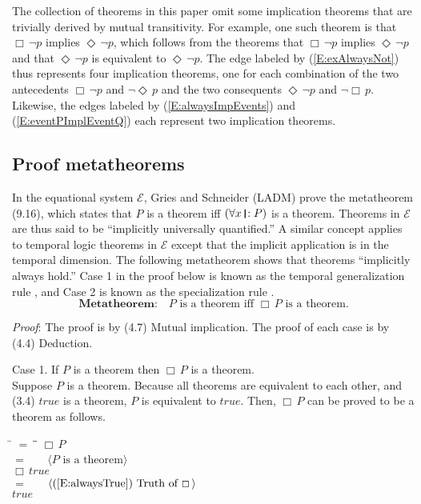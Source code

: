 \documentclass[12pt, fleqn, leqno]{article}
\newcommand{\lgap}{2pt}                             %
\newcommand{\mymathindent}{24pt}                    %
\newcommand{\Event}{\Diamond\,}
\newcommand{\Always}{\Box\,}
\newcommand{\myqedtab}{\hspace{384pt}}              %
\newcommand{\thedr}{\rule[-.25ex]{.32mm}{1.75ex}}   %
\newcommand{\drrb}{\;\thedr\,{:}\;}                 %
\newcommand{\all}{\forall}                          %
\newcommand{\Gll} {\langle}                         %
\newcommand{\Ggg} {\rangle}                         %
\newcommand{\Hint}[1]     {\ \ \ $\Gll              \mbox{#1} \Ggg$ }   %
\begin{document}
The collection of theorems in this paper omit some implication theorems that are trivially derived by mutual transitivity.
For example, one such theorem is that $\Always\neg p$ implies $\Event \neg p$, which follows from the theorems that $\Always\neg p$ implies $\Event\neg p$ and that $\Event\neg p$ is equivalent to $\Event \neg p$.
The edge labeled by (\ref{E:exAlwaysNot}) thus represents four implication theorems, one for each combination of the two antecedents $\Always\neg p$ and $\neg\Event p$ and the two consequents $\Event\neg p$ and $\neg\Always p$.
Likewise, the edges labeled by (\ref{E:alwaysImpEvents}) and (\ref{E:eventPImplEventQ}) each represent two implication theorems.

\subsection{Proof metatheorems}

In the equational system $\mathcal{E}$, Gries and Schneider (LADM) prove the metatheorem (9.16), which states that
$P$ is a theorem iff $(\all x\drrb P)$ is a theorem. \cite{LADM}
Theorems in $\mathcal{E}$ are thus said to be ``implicitly universally quantified.''
A similar concept applies to temporal logic theorems in $\mathcal{E}$ except that the implicit application is in the temporal dimension.
The following metatheorem shows that theorems ``implicitly always hold.''
Case 1 in the proof below is known as the temporal generalization rule \cite{Schn}, and Case 2 is known as the specialization rule \cite{Manna}.
\begin{equation}\label{E:metatheorem}
\textbf{Metatheorem:}\quad P \text{ is a theorem iff } \Always P \text{ is a theorem.}
\end{equation}

\emph{Proof}: The proof is by (4.7) Mutual implication.
The proof of each case is by (4.4) Deduction.

Case 1. If $P$ is a theorem then $\Always P$ is a theorem.\\
Suppose $P$ is a theorem.
Because all theorems are equivalent to each other, and (3.4) $true$ is a theorem, $P$ is equivalent to $true$.
Then, $\Always P$ can be proved to be a theorem as follows.
\begin{tabbing}
\hspace{\mymathindent} \= $= \;$ \= \myqedtab \= \kill
\> \> $\Always P$\\[\lgap]
\> $=$ \> \Hint{$P$ is a theorem} \\[\lgap]
\> \> $\Always true$\\[\lgap]
\> $=$ \> \Hint{(\ref{E:alwaysTrue}) Truth of $\Always$} \\[\lgap]
\> \> $true$
\end{tabbing}
\end{document}
